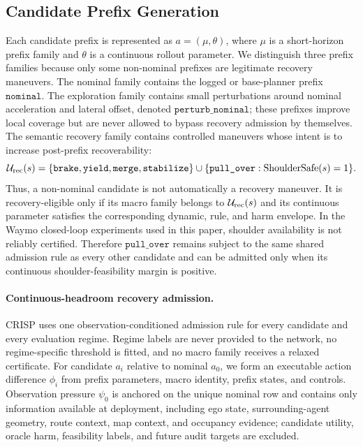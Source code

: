 \documentclass[conference]{IEEEtran}
\begin{document}
\subsection{Candidate Prefix Generation}
\label{app:candidate_prefix}

Each candidate prefix is represented as $a=(\mu,\theta)$, where $\mu$ is a short-horizon prefix family and $\theta$ is a continuous rollout parameter.  We distinguish three prefix families because only some non-nominal prefixes are legitimate recovery maneuvers.  The nominal family contains the logged or base-planner prefix $\texttt{nominal}$.  The exploration family contains small perturbations around nominal acceleration and lateral offset, denoted $\texttt{perturb\_nominal}$; these prefixes improve local coverage but are never allowed to bypass recovery admission by themselves.  The semantic recovery family contains controlled maneuvers whose intent is to increase post-prefix recoverability:
\begin{equation}
\mathcal{U}_{\rm rec}(s)=
\{\texttt{brake},\texttt{yield},\texttt{merge},\texttt{stabilize}\}
\cup \{\texttt{pull\_over}:\mathrm{ShoulderSafe}(s)=1\}.
\end{equation}
Thus, a non-nominal candidate is not automatically a recovery maneuver.  It is recovery-eligible only if its macro family belongs to $\mathcal{U}_{\rm rec}(s)$ and its continuous parameter satisfies the corresponding dynamic, rule, and harm envelope.  In the Waymo closed-loop experiments used in this paper, shoulder availability is not reliably certified. Therefore $\texttt{pull\_over}$ remains subject to the same shared admission rule as every other candidate and can be admitted only when its continuous shoulder-feasibility margin is positive.


\paragraph{Continuous-headroom recovery admission.}
CRISP uses one observation-conditioned admission rule for every candidate and every evaluation regime.  Regime labels are never provided to the network, no regime-specific threshold is fitted, and no macro family receives a relaxed certificate.  For candidate $a_i$ relative to nominal $a_0$, we form an executable action difference $\phi_i$ from prefix parameters, macro identity, prefix states, and controls.  Observation pressure $\psi_0$ is anchored on the unique nominal row and contains only information available at deployment, including ego state, surrounding-agent geometry, route context, map context, and occupancy evidence; candidate utility, oracle harm, feasibility labels, and future audit targets are excluded.
\end{document}

